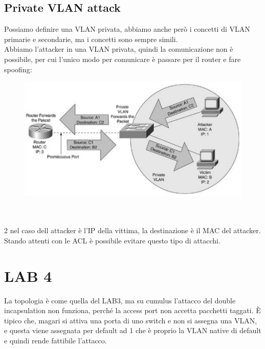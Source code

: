 \documentclass[12pt, oneside]{extbook} %
\begin{document}
\subsection{Private VLAN attack}
Possiamo definire una VLAN privata, abbiamo anche però i concetti di VLAN primarie e secondarie, ma i concetti sono sempre simili.
\\Abbiamo l'attacker in una VLAN privata, quindi la comunicazione non è possibile, per cui l'unico modo per comunicare è passare per il router e fare spoofing:\\
    \begin{figure}[h!]
        \includegraphics[scale=0.4]{../../immagini/pvlan_attack}
    \end{figure}
\\\\2 nel caso dell attacker è l'IP della vittima, la destinazione è il MAC del attacker. Stando attenti con le ACL è possibile evitare questo tipo di attacchi.

\section*{LAB 4}
La topologia è come quella del LAB3, ma su cumulus l'attacco del double incapsulation non funziona, perché la access port non accetta pacchetti taggati. È tipico che, magari si attiva una porta di uno switch e non si assegna una VLAN, e questa viene assegnata per default ad 1 che è proprio la VLAN native di default e quindi rende fattibile l'attacco.
\end{document}
